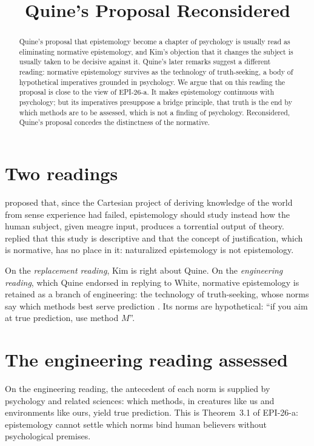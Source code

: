 \documentclass{situationist-preprint}
\title{Quine's Proposal Reconsidered}
\begin{document}
\maketitle

\begin{abstract}
Quine's proposal that epistemology become a chapter of psychology is usually read as eliminating normative epistemology, and Kim's objection that it changes the subject is usually taken to be decisive against it. Quine's later remarks suggest a different reading: normative epistemology survives as the technology of truth-seeking, a body of hypothetical imperatives grounded in psychology. We argue that on this reading the proposal is close to the view of EPI-26-a. It makes epistemology continuous with psychology; but its imperatives presuppose a bridge principle, that truth is the end by which methods are to be assessed, which is not a finding of psychology. Reconsidered, Quine's proposal concedes the distinctness of the normative.
\end{abstract}

\section{Two readings}

\citet{Quine1969} proposed that, since the Cartesian project of deriving knowledge of the world from sense experience had failed, epistemology should study instead how the human subject, given meagre input, produces a torrential output of theory. \citet{Kim1988} replied that this study is descriptive and that the concept of justification, which is normative, has no place in it: naturalized epistemology is not epistemology.

On the \emph{replacement reading}, Kim is right about Quine. On the \emph{engineering reading}, which Quine endorsed in replying to White, normative epistemology is retained as a branch of engineering: the technology of truth-seeking, whose norms say which methods best serve prediction \citep{Quine1986}. Its norms are hypothetical: \enquote{if you aim at true prediction, use method $M$}.

\section{The engineering reading assessed}

On the engineering reading, the antecedent of each norm is supplied by psychology and related sciences: which methods, in creatures like us and environments like ours, yield true prediction. This is Theorem~3.1 of EPI-26-a: epistemology cannot settle which norms bind human believers without psychological premises.
\end{document}
